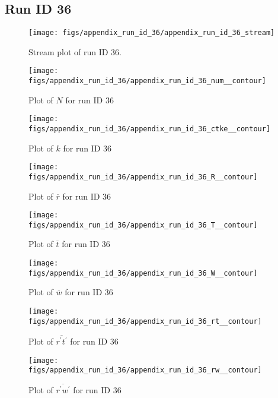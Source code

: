 \subsection{Run ID 36}
\begin{figure}[H]
\centering
\texttt{[image: figs/appendix\_run\_id\_36/appendix\_run\_id\_36\_stream]}
\caption{Stream plot of run ID 36.}
\label{fig:appendix_run_id_36_stream}
\end{figure}


\begin{figure}[H]
\centering
\texttt{[image: figs/appendix\_run\_id\_36/appendix\_run\_id\_36\_num\_\_contour]}
\caption{Plot of $N$ for run ID 36}
\label{fig:appendix_run_id_36_num__contour}
\end{figure}


\begin{figure}[H]
\centering
\texttt{[image: figs/appendix\_run\_id\_36/appendix\_run\_id\_36\_ctke\_\_contour]}
\caption{Plot of $k$ for run ID 36}
\label{fig:appendix_run_id_36_ctke__contour}
\end{figure}


\begin{figure}[H]
\centering
\texttt{[image: figs/appendix\_run\_id\_36/appendix\_run\_id\_36\_R\_\_contour]}
\caption{Plot of $\overline{r}$ for run ID 36}
\label{fig:appendix_run_id_36_R__contour}
\end{figure}


\begin{figure}[H]
\centering
\texttt{[image: figs/appendix\_run\_id\_36/appendix\_run\_id\_36\_T\_\_contour]}
\caption{Plot of $\overline{t}$ for run ID 36}
\label{fig:appendix_run_id_36_T__contour}
\end{figure}


\begin{figure}[H]
\centering
\texttt{[image: figs/appendix\_run\_id\_36/appendix\_run\_id\_36\_W\_\_contour]}
\caption{Plot of $\overline{w}$ for run ID 36}
\label{fig:appendix_run_id_36_W__contour}
\end{figure}


\begin{figure}[H]
\centering
\texttt{[image: figs/appendix\_run\_id\_36/appendix\_run\_id\_36\_rt\_\_contour]}
\caption{Plot of $\overline{r^\prime t^\prime}$ for run ID 36}
\label{fig:appendix_run_id_36_rt__contour}
\end{figure}


\begin{figure}[H]
\centering
\texttt{[image: figs/appendix\_run\_id\_36/appendix\_run\_id\_36\_rw\_\_contour]}
\caption{Plot of $\overline{r^\prime w^\prime}$ for run ID 36}
\label{fig:appendix_run_id_36_rw__contour}
\end{figure}


